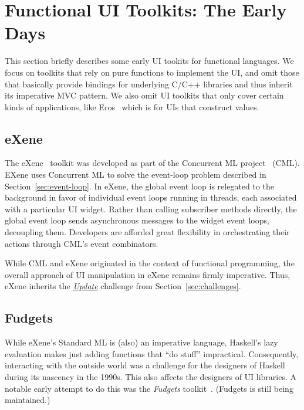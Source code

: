 \documentclass[sigplan,review,screen]{acmart}
\begin{document}
\section{Functional UI Toolkits: The Early Days}
\label{sec:functional-ui}

This section briefly describes some early UI tookits for functional
languages.  We focus on toolkits that rely on pure functions to implement
the UI, and omit those that basically provide bindings for
underlying C/C++ libraries and thus
inherit its imperative MVC pattern.  We also omit UI toolkits that
only cover certain kinds of applications, like Eros~\cite{Eros} which is
for UIs that construct values.

\subsection{eXene}

The eXene~\cite{eXene} toolkit was developed as part of the Concurrent
ML project~\cite{ConcurrentML} (CML).  EXene
uses Concurrent ML to solve the event-loop problem described in
Section~\ref{sec:event-loop}.  In eXene, the global event loop is
relegated to the background in favor of individual event loops running
in threads, each associated with a particular UI widget.  Rather than calling
subscriber methods directly, the global event loop sends asynchronous
messages to the widget event loops, decoupling them.  Developers
are afforded great flexibility in orchestrating their
actions through CML's event combinators.

While CML and eXene originated in the context of functional
programming, the overall approach of UI manipulation in eXene remains
firmly imperative.  Thus, eXene inherits the \hyperlink{challenge:update}{\textit{Update}} challenge from Section~\ref{sec:challenges}.

\subsection{Fudgets}

While eXene's Standard ML is (also) an imperative language,
Haskell's lazy evaluation makes just adding functions that ``do
stuff'' impractical.  Consequently, interacting with the outside world
was a challenge for the designers of Haskell during its
nascency in the 1990s.  This also affects the designers of UI
libraries.  A notable early attempt to do this was the
\textit{Fudgets} toolkit~\cite{Fudgets}.  (Fudgets is still being maintained.)
\end{document}
